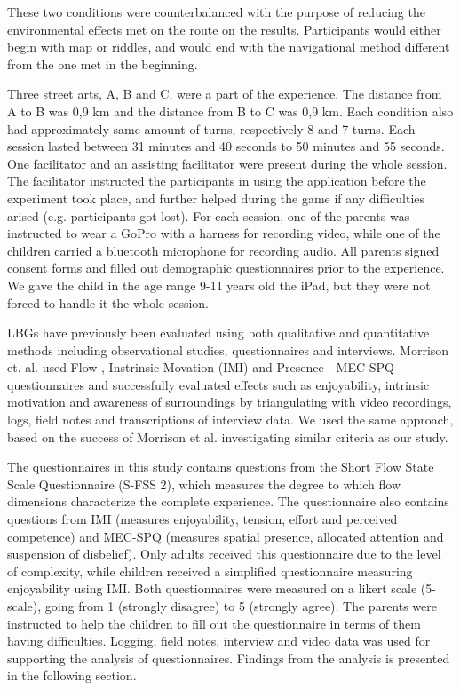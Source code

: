 These two conditions were counterbalanced with the purpose of reducing the environmental effects met on the route on the results. Participants would either begin with map or riddles, and would end with the navigational method different from the one met in the beginning. 

Three street arts, A, B and C, were a part of the experience. The distance from A to B was 0,9 km and the distance from B to C was 0,9 km. Each condition also had approximately same amount of turns, respectively 8 and 7 turns. Each session lasted between 31 minutes and 40 seconds to 50 minutes and 55 seconds. One facilitator and  an assisting facilitator were present during the whole session. The facilitator instructed the participants in using the application before the experiment took place, and further helped during the game if any difficulties arised (e.g. participants got lost). For each session, one of the parents was instructed to wear a GoPro with a harness for recording video, while one of the children carried a bluetooth microphone for recording audio. All parents signed consent forms and filled out demographic questionnaires prior to the experience. We gave the child in the age range 9-11 years old the iPad, but they were not forced to handle it the whole session. 

LBGs have previously been evaluated using both qualitative and quantitative methods including observational studies, questionnaires and interviews. Morrison et. al. used Flow \cite{GameFlow} , Instrinsic Movation (IMI) \cite{whatwhy} and Presence - MEC-SPQ \cite{Presence} questionnaires and successfully evaluated effects such as enjoyability, intrinsic motivation and awareness of surroundings by triangulating with video recordings, logs, field notes and transcriptions of interview data. We used the same approach, based on the success of Morrison et al. investigating similar criteria as our study. 

The questionnaires in this study contains questions from the Short Flow State Scale Questionnaire (S-FSS 2), which measures the degree to which flow dimensions characterize the
complete experience\cite{flowfss}. The questionnaire also contains questions from IMI (measures enjoyability, tension, effort and perceived competence) and MEC-SPQ (measures spatial presence, allocated attention and suspension of disbelief). Only adults received this questionnaire due to the level of complexity, while children received a simplified questionnaire measuring enjoyability using IMI. Both questionnaires were measured on a likert scale (5-scale), going from 1 (strongly disagree) to 5 (strongly agree). The parents were instructed to help the children to fill out the questionnaire in terms of them having difficulties. Logging, field notes, interview and video data was used for supporting the analysis of questionnaires. Findings from the analysis is presented in the following section. 
 
